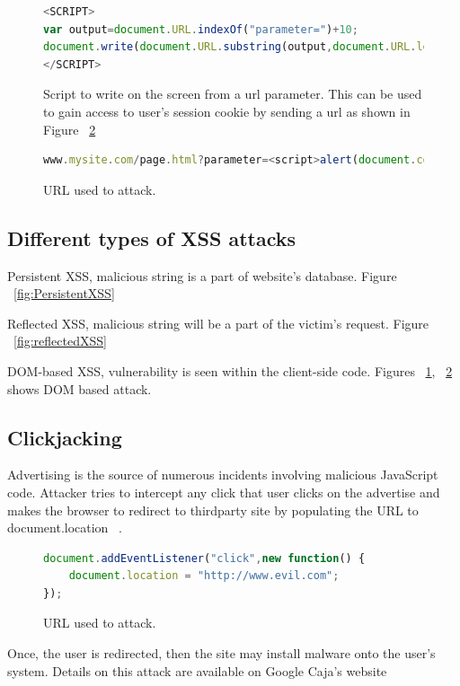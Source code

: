 \begin{figure}[h]
  \centering
\begin{lstlisting}[language=JavaScript] 
 <SCRIPT>
var output=document.URL.indexOf("parameter=")+10;
document.write(document.URL.substring(output,document.URL.length));
</SCRIPT>
\end{lstlisting}
\caption[DOM based XSS attack 1]
    {Script to write on the screen from a url parameter. This can be used to gain access to user's session cookie by sending a url as shown in Figure ~\ref{fig:DOMXSS2}}
    \label{fig:DOMXSS1}
\end{figure}


\begin{figure}[h]
  \centering
\begin{lstlisting}[language=JavaScript] 
www.mysite.com/page.html?parameter=<script>alert(document.cookie)</script>
\end{lstlisting}
\caption[DOM based XSS attack 2]
    {URL used to attack.}
    \label{fig:DOMXSS2}
\end{figure}

\subsection{Different types of XSS attacks}
Persistent XSS, malicious string is a part of website's database. Figure ~\ref{fig:PersistentXSS}

Reflected XSS, malicious string will be a part of the victim's request. Figure ~\ref{fig:reflectedXSS}

DOM-based XSS, vulnerability is seen within the client-side code. Figures ~\ref{fig:DOMXSS1}, ~\ref{fig:DOMXSS2} shows DOM based attack.

\subsection{Clickjacking}
Advertising is the source of numerous incidents involving malicious JavaScript code. Attacker tries to intercept any click that user clicks on the advertise and makes the browser to redirect to thirdparty site by populating the URL to document.location ~\cite{jsattackclick}.
\begin{figure}[h]
  \centering
\begin{lstlisting}[language=JavaScript] 
document.addEventListener("click",new function() {
	document.location = "http://www.evil.com";
});
\end{lstlisting}
\caption[DOM based XSS attack 2]
    {URL used to attack.}
    \label{fig:clickjackingattack}
\end{figure}
Once, the user is redirected, then the site may install malware onto the user's system. Details on this attack are available on Google Caja's website ~\cite{caja}

